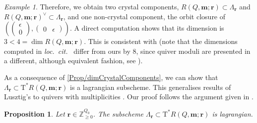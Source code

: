 \documentclass[a4paper,12pt]{article}
\theoremstyle{definition}
\theoremstyle{plain}
\newtheorem{proposition}[definition]{Proposition}
\theoremstyle{remark}
\newtheorem{example}[definition]{Example}
\newcommand\bbZ{\mathbb{Z}}
\newcommand\bfm{\mathbf{m}}
\newcommand\bfr{\mathbf{r}}
\begin{document}
\begin{example}
Therefore, we obtain two crystal components, $R(Q,\bfm;\bfr)\subset\Lambda_\bfr$ and $R(Q,\bfm;\bfr)^\vee\subset\Lambda_\bfr$, and one non-crystal component, the orbit closure of $\left((\begin{smallmatrix}\epsilon \\ 0\end{smallmatrix}),(\begin{smallmatrix}0 & \epsilon\end{smallmatrix})\right)$. A direct computation shows that its dimension is $3<4=\dim R(Q,\bfm;\bfr)$. This is consistent with \cite[\S 8.2.2]{GLS18a} (note that the dimensions computed in \emph{loc.\ cit.\ } differ from ours by $8$, since quiver moduli are presented in a different, although equivalent fashion, see \cite[\S 2.2-2.3]{GLS18a}).
\end{example}

As a consequence of \cref{Prop/dimCrystalComponents}, we can show that $\Lambda_\bfr\subset\mathrm{T}^*R(Q,\bfm;\bfr)$ is a lagrangian subscheme. This generalises results of Lusztig's to quivers with multiplicities \cite{Lus91,Lus92}. Our proof follows the argument given in \cite[Thm.\ 4.12]{S12b}.

\begin{proposition}\label{Prop/lagrangianNilCone}
Let $\bfr\in\bbZ_{\geq0}^{Q_0}$. The subscheme $\Lambda_\bfr\subset\mathrm{T}^*R(Q,\bfm;\bfr)$ is lagrangian.
\end{proposition}
\end{document}
